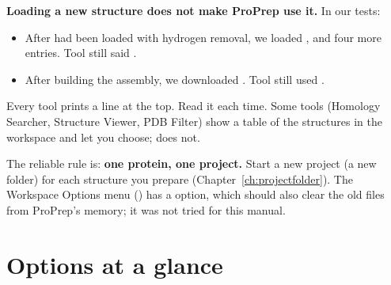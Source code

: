 \begin{watchout}
\textbf{Loading a new structure does not make ProPrep use it.} In our tests:
\begin{itemize}
  \item After  had been loaded with hydrogen removal, we loaded
        ,  and four more entries. Tool  still said
        .
  \item After building the  assembly, we downloaded .
        Tool  still used .
\end{itemize}
Every tool prints a  line at the top. Read it each
time. Some tools (Homology Searcher, Structure Viewer, PDB Filter) show a table
of the structures in the workspace and let you choose;  does not.
\end{watchout}

The reliable rule is: \textbf{one protein, one project.} Start a new project
(a new folder) for each structure you prepare (Chapter~\ref{ch:projectfolder}).
The Workspace Options menu () has a  option,
which should also clear the old files from ProPrep's memory; it was not tried
for this manual.

\section{Options at a glance}

